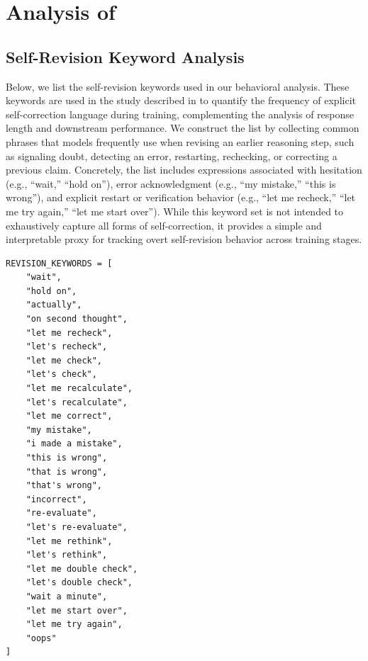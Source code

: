 \section{Analysis of \ours{}}
\label{app:analysisofours}
\subsection{Self-Revision Keyword Analysis} \label{app:keywords}
Below, we list the self-revision keywords used in our behavioral analysis. These keywords are used in the study described in  to quantify the frequency of explicit self-correction language during training, complementing the analysis of response length and downstream performance. We construct the list by collecting common phrases that models frequently use when revising an earlier reasoning step, such as signaling doubt, detecting an error, restarting, rechecking, or correcting a previous claim. Concretely, the list includes expressions associated with hesitation (e.g., “wait,” “hold on”), error acknowledgment (e.g., “my mistake,” “this is wrong”), and explicit restart or verification behavior (e.g., “let me recheck,” “let me try again,” “let me start over”). While this keyword set is not intended to exhaustively capture all forms of self-correction, it provides a simple and interpretable proxy for tracking overt self-revision behavior across training stages.



\begin{tcolorbox}[
    colback=lightblue!30,
    colframe=vividblue,
    coltitle=black,
    title=List of Self-Revision Keywords Used in Behavioral Analysis (\Cref{sec:behavioral_analysis}),
    boxrule=0.8pt,
      arc=2pt,
      left=6pt,
      right=6pt,
      top=4pt,
      bottom=4pt
]
\begin{lstlisting}[style=pythonstyle]
REVISION_KEYWORDS = [
    "wait",
    "hold on",
    "actually",
    "on second thought",
    "let me recheck",
    "let's recheck",
    "let me check",
    "let's check",
    "let me recalculate",
    "let's recalculate",
    "let me correct",
    "my mistake",
    "i made a mistake",
    "this is wrong",
    "that is wrong",
    "that's wrong",
    "incorrect",
    "re-evaluate",
    "let's re-evaluate",
    "let me rethink",
    "let's rethink",
    "let me double check",
    "let's double check",
    "wait a minute",
    "let me start over",
    "let me try again",
    "oops"
]
\end{lstlisting}
\end{tcolorbox}

